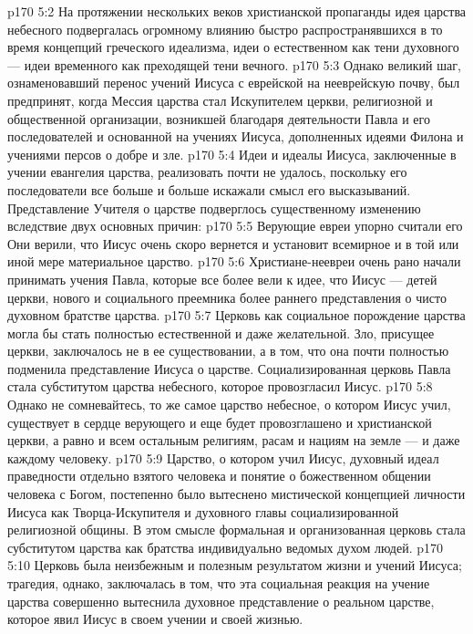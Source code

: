 \vs p170 5:2 На протяжении нескольких веков христианской пропаганды идея царства небесного подвергалась огромному влиянию быстро распространявшихся в то время концепций греческого идеализма, идеи о естественном как тени духовного --- идеи временного как преходящей тени вечного.
\vs p170 5:3 Однако великий шаг, ознаменовавший перенос учений Иисуса с еврейской на нееврейскую почву, был предпринят, когда Мессия царства стал Искупителем церкви, религиозной и общественной организации, возникшей благодаря деятельности Павла и его последователей и основанной на учениях Иисуса, дополненных идеями Филона и учениями персов о добре и зле.
\vs p170 5:4 Идеи и идеалы Иисуса, заключенные в учении евангелия царства, реализовать почти не удалось, поскольку его последователи все больше и больше искажали смысл его высказываний. Представление Учителя о царстве подверглось существенному изменению вследствие двух основных причин:
\vs p170 5:5 \bibnobreakspace Верующие евреи упорно считали его  Они верили, что Иисус очень скоро вернется и установит всемирное и в той или иной мере материальное царство.
\vs p170 5:6 \bibnobreakspace Христиане\hyp{}неевреи очень рано начали принимать учения Павла, которые все более вели к идее, что Иисус ---  детей церкви, нового и социального преемника более раннего представления о чисто духовном братстве царства.
\vs p170 5:7 \pc Церковь как социальное порождение царства могла бы стать полностью естественной и даже желательной. Зло, присущее церкви, заключалось не в ее существовании, а в том, что она почти полностью подменила представление Иисуса о царстве. Социализированная церковь Павла стала субститутом царства небесного, которое провозгласил Иисус.
\vs p170 5:8 Однако не сомневайтесь, то же самое царство небесное, о котором Иисус учил, существует в сердце верующего и еще будет провозглашено и христианской церкви, а равно и всем остальным религиям, расам и нациям на земле --- и даже каждому человеку.
\vs p170 5:9 Царство, о котором учил Иисус, духовный идеал праведности отдельно взятого человека и понятие о божественном общении человека с Богом, постепенно было вытеснено мистической концепцией личности Иисуса как Творца\hyp{}Искупителя и духовного главы социализированной религиозной общины. В этом смысле формальная и организованная церковь стала субститутом царства как братства индивидуально ведомых духом людей.
\vs p170 5:10 Церковь была неизбежным и полезным  результатом жизни и учений Иисуса; трагедия, однако, заключалась в том, что эта социальная реакция на учение царства совершенно вытеснила духовное представление о реальном царстве, которое явил Иисус в своем учении и своей жизнью.
